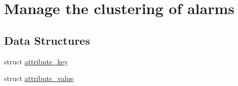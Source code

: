 \hypertarget{group__cluster}{
\section{Manage the clustering of alarms}
\label{group__cluster}
}
\subsection*{Data Structures}
\begin{DoxyCompactItemize}
\item 
struct \hyperlink{structattribute__key}{attribute\_\-key}
\item 
struct \hyperlink{structattribute__value}{attribute\_\-value}
\end{DoxyCompactItemize}
